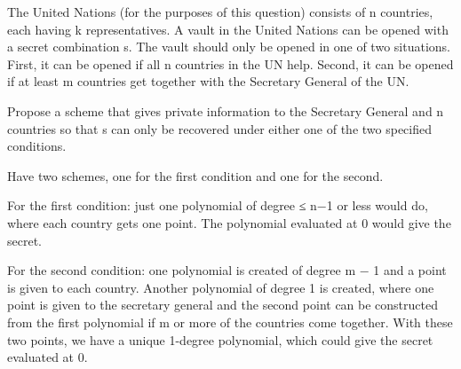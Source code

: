 \question The United Nations (for the purposes of this question) consists of n countries, each having k representatives.
A vault in the United Nations can be opened with a secret combination s. The vault should
only be opened in one of two situations. First, it can be opened if all n countries in the UN help.
Second, it can be opened if at least m countries get together with the Secretary General of the UN.

Propose a scheme that gives private information to the Secretary General and n countries so that s can
only be recovered under either one of the two specified conditions.

 
\begin{solution}
Have two schemes, one for the first condition and one for the second.

For the first condition: just one polynomial of degree ≤ n−1 or less would do, where each country
gets one point. The polynomial evaluated at 0 would give the secret.

For the second condition: one polynomial is created of degree m − 1 and a point is given to each
country. Another polynomial of degree 1 is created, where one point is given to the secretary general
and the second point can be constructed from the first polynomial if m or more of the countries come
together. With these two points, we have a unique 1-degree polynomial, which could give the secret
evaluated at 0.
\end{solution}
\newpage
